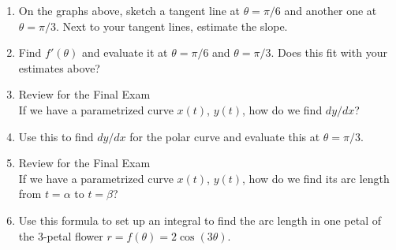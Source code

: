 \documentclass[11pt]{amsart}
\begin{document}
\begin{center}

\end{center}
	\begin{enumerate}
	\item On the graphs above, sketch a tangent line at $\theta=\pi/6$ and another one at $\theta = \pi/3.$ Next to your tangent lines, estimate the slope.
	\vskip 0.2in
	\item Find $f'(\theta)$ and evaluate it at $\theta = \pi/6$ and $\theta = \pi/3.$ Does this fit with your estimates above?
	\vfill
	\item Review for the Final Exam\\
	If we have a parametrized curve $x(t)$, $y(t)$, how do we find $dy/dx$?
	\vfill
	\item Use this to find $dy/dx$ for the polar curve and evaluate this at  $\theta = \pi/3.$
	\vfill
	\vfill
	\newpage
	\item Review for the Final Exam\\
	 If we have a parametrized curve $x(t)$, $y(t)$, how do we find its arc length from $t=\alpha$ to $t=\beta$?
	\vfill
	\item Use this formula to set up an integral to find the arc length in one petal of the 3-petal flower $r=f(\theta)=2 \cos (3 \theta).$
	\vfill
	\end{enumerate}
\end{document}
